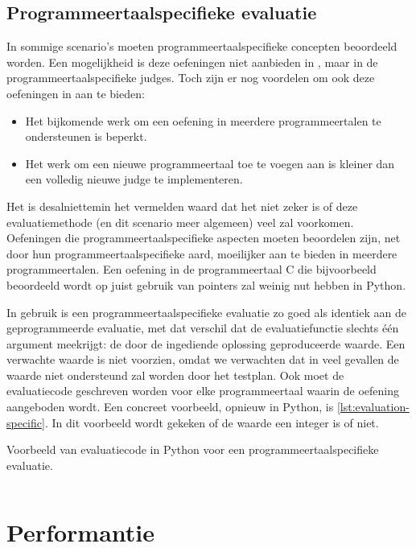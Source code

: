 \subsection{Programmeertaalspecifieke evaluatie}\label{subsec:programmeertaalspecifieke-evaluatie}

In sommige scenario's moeten programmeertaalspecifieke concepten beoordeeld worden.
Een mogelijkheid is deze oefeningen niet aanbieden in \tested{}, maar in de programmeertaalspecifieke judges.
Toch zijn er nog voordelen om ook deze oefeningen in \tested{} aan te bieden:
\begin{itemize}
    \item Het bijkomende werk om een oefening in meerdere programmeertalen te ondersteunen is beperkt.
    \item Het werk om een nieuwe programmeertaal toe te voegen aan \tested{} is kleiner dan een volledig nieuwe judge te implementeren.
\end{itemize}
Het is desalniettemin het vermelden waard dat het niet zeker is of deze evaluatiemethode (en dit scenario meer algemeen) veel zal voorkomen.
Oefeningen die programmeertaalspecifieke aspecten moeten beoordelen zijn, net door hun programmeertaalspecifieke aard, moeilijker aan te bieden in meerdere programmeertalen.
Een oefening in de programmeertaal C die bijvoorbeeld beoordeeld wordt op juist gebruik van pointers zal weinig nut hebben in Python.

In gebruik is een programmeertaalspecifieke evaluatie zo goed als identiek aan de geprogrammeerde evaluatie, met dat verschil dat de evaluatiefunctie slechts één argument meekrijgt: de door de ingediende oplossing geproduceerde waarde.
Een verwachte waarde is niet voorzien, omdat we verwachten dat in veel gevallen de waarde niet ondersteund zal worden door het testplan.
Ook moet de evaluatiecode geschreven worden voor elke programmeertaal waarin de oefening aangeboden wordt.
Een concreet voorbeeld, opnieuw in Python, is \cref{lst:evaluation-specific}.
In dit voorbeeld wordt gekeken of de waarde een integer is of niet.

\begin{listing}
    \caption{Voorbeeld van evaluatiecode in Python voor een programmeertaalspecifieke evaluatie.}
    \label{lst:evaluation-specific}
    \inputminted{python}{code/evaluator-specific.py}
\end{listing}

\section{Performantie}\label{sec:performantie}

